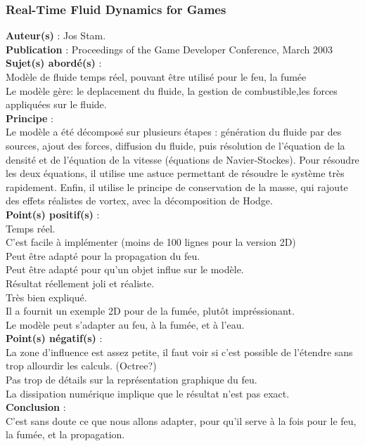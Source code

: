 \documentclass[a4paper,10pt]{article}
\begin{document}
\subsubsection{Real-Time Fluid Dynamics for Games}
\textbf{Auteur(s)} : Jos Stam.\\
\textbf{Publication} : Proceedings of the Game Developer Conference, March 2003 \\
\textbf{Sujet(s) abordé(s)} : \\Modèle de fluide temps réel, pouvant être utilisé pour le feu, la fumée\\
	Le modèle gère: le deplacement du fluide, la gestion de combustible,les forces appliquées sur le fluide.\\	
\textbf{Principe} :\\
	Le modèle a été décomposé sur plusieurs étapes : génération du fluide par des sources, ajout des forces, diffusion du fluide, puis résolution de l'équation de la densité et de l'équation de la vitesse (équations de Navier-Stockes).
	Pour résoudre les deux équations, il utilise une astuce permettant de résoudre le système très rapidement.
	Enfin, il utilise le principe de conservation de la masse, qui rajoute des effets réalistes de vortex, avec la décomposition de Hodge.\\
\textbf{Point(s) positif(s)} :\\
	Temps réel.\\
	C'est facile à implémenter (moins de 100 lignes pour la version 2D)\\
	Peut être adapté pour la propagation du feu.\\
	Peut être adapté pour qu'un objet influe sur le modèle.\\
	Résultat réellement joli et réaliste.\\
	Très bien expliqué.\\
	Il a fournit un exemple 2D pour de la fumée, plutôt impréssionant.\\
	Le modèle peut s'adapter au feu, à la fumée, et à l'eau.\\
\textbf{Point(s) négatif(s)} :\\
	La zone d'influence est assez petite, il faut voir si c'est possible de l'étendre sans trop allourdir les calculs. (Octree?) \\
	Pas trop de détails sur la représentation graphique du feu.\\	
	La dissipation numérique implique que le résultat n'est pas exact.\\
\textbf{Conclusion} :\\
	C'est sans doute ce que nous allons adapter, pour qu'il serve à la fois pour le feu, la fumée, et la propagation.
\end{document}
